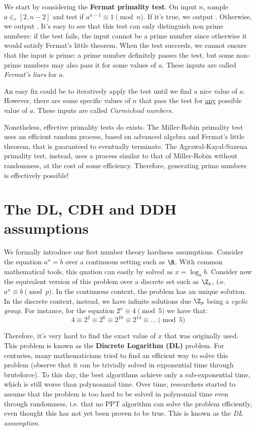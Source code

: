 \documentclass[a4paper, 12pt]{report}
\begin{document}
    We start by considering the \textbf{Fermat primality test}. On input $n$, sample $a \in_r [2, n-2]$ and test if $a^{n-1} \equiv 1 \pmod n$. If it's true, we output . Otherwise, we output . It's easy to see that this test can only distinguish non prime numbers: if the test fails, the input cannot be a prime number since otherwise it would satisfy Fermat's little theorem. When the test succeeds, we cannot ensure that the input is prime: a prime number definitely passes the test, but some non-prime numbers may also pass it for some values of $a$. These inputs are called \textit{Fermat's liars} for $a$.
    
    An easy fix could be to iteratively apply the test until we find a nice value of $a$. However, there are some specific values of $n$ that pass the test for \underline{any} possible value of $a$. These inputs are called \textit{Carmicheal numbers}.

    Nonetheless, effective primality tests do exists. The Miller-Robin primality test uses an efficient random process, based on advanced algebra and Fermat's little theorem, that is guaranteed to eventually terminate. The Agrawal-Kayal-Saxena primality test, instead, uses a process similar to that of Miller-Robin without randomness, at the cost of some efficiency. Therefore, generating prime numbers is effectively possible!

    \section{The DL, CDH and DDH assumptions}

    We formally introduce our first number theory hardness assumptions. Consider the equation $a^x = b$ over a continuous setting such as $\R$. With common mathematical tools, this quation can easily by solved as $x = \log_a b$. Consider now the equivalent version of this problem over a discrete set such as $\Z_p$, i.e. $a^x \equiv b \pmod p$. In the continuous context, the problem  has an unique solution. In the discrete context, instead, we have infinite solutions due $\Z_p$ being a \textit{cyclic group}. For instance, for the equation $2^x \equiv 4 \pmod 5$ we have that:
    \[4 \equiv 2^2 \equiv 2^6 \equiv 2^{10} \equiv 2^{14} \equiv \ldots \pmod 5\]

    Therefore, it's very hard to find the exact value of $x$ that was originally used. This problem is known as the \textbf{Discrete Logarithm (DL)} problem. For centuries, many mathematicians tried to find an efficient way to solve this problem (observe that it can be trivially solved in exponential time through bruteforce). To this day, the best algorithms achieve only a sub-exponential time, which is still worse than polynoamial time. Over time, researchers started to assume that the problem is too hard to be solved in polynomial time even through randomness, i.e. that no PPT algorithm can solve the problem efficiently, even thought this has not yet been proven to be true. This is known as the \textit{DL assumption}.
    
\end{document}
